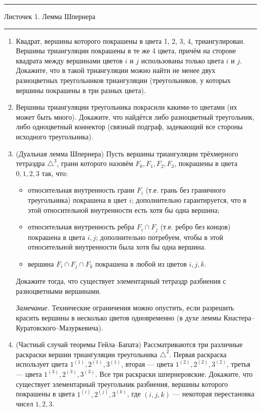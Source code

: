 \documentclass[12pt]{article}
\newcommand{\HRule}{\rule{\linewidth}{0.5mm}}
\begin{document}
{
\HRule
 \normalfont \Large \center
   Листочек 1. Лемма Шпернера

\HRule
}



\begin{enumerate}
\setcounter{enumi}{0}
\item Квадрат, вершины которого покрашены в цвета 1, 2, 3, 4, триангулирован. Вершины триангуляции покрашены в те же 4 цвета, причём на стороне квадрата между вершинами цветов $i$ и $j$ использованы только цвета $i$ и $j$. Докажите, что в такой триангуляции можно найти не менее двух разноцветных треугольников триангуляции (треугольников, у которых вершины покрашены в три разных цвета).

  \item Вершины триангуляции треугольника покрасили какими-то цветами (их может быть много). Докажите, что найдётся либо разноцветный треугольник, либо одноцветный коннектор (связный подграф, задевающий все стороны исходного треугольника).

  \item (Дуальная лемма Шпернера) Пусть вершины триангуляции трёхмерного тетраэдра $\triangle^{3}$, грани которого назовём $F_0, F_1, F_2, F_3$, покрашены в цвета $0, 1, 2, 3$ так, что:
   \begin{itemize}
   \item относительная внутренность грани $F_i$ (т.е. грань без граничного треугольника) покрашена в цвет $i$; дополнительно гарантируется, что в этой относительной внутренности есть хотя бы одна вершина;

   \item относительная внутренность ребра $F_i \cap F_j$ (т.е. ребро без концов) покрашена в цвета $i,j$; дополнительно потребуем, чтобы в этой относительной внутренности была хотя бы одна вершина.

   \item вершина $F_i \cap F_j \cap F_k$ покрашена в любой из цветов $i,j,k$.
   \end{itemize}

   Докажите тогда, что существует элементарный тетраэдр разбиения с разноцветными вершинами.

   \emph{Замечание.} Технические ограничения можно опустить, если разрешить красить вершины в несколько цветов одновременно (в духе леммы Кнастера--Куратовского--Мазуркевича).

  \item (Частный случай теоремы Гейла--Бапата) Рассматриваются три различные раскраски вершин триангуляции треугольника $\triangle^{2}$. Первая раскраска использует цвета $1^{(1)}, 2^{(1)}, 3^{(1)}$, вторая --- цвета $1^{(2)}, 2^{(2)}, 3^{(2)}$, третья --- цвета $1^{(3)}, 2^{(3)}, 3^{(3)}$. Все три раскраски шпернеровские. Докажите, что существует элементарный треугольник разбиения, вершины которого покрашены в цвета $1^{(i)}, 2^{(j)}, 3^{(k)}$, где $(i, j, k)$ --- некоторая перестановка чисел $1,2,3$.


\end{enumerate}
\end{document}

